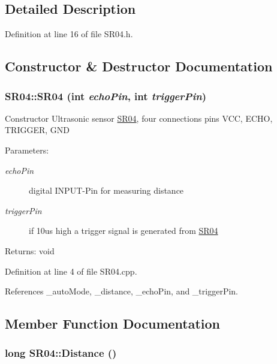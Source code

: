 \subsection{Detailed Description}


Definition at line 16 of file SR04.h.

\subsection{Constructor \& Destructor Documentation}
\hypertarget{class_s_r04_7af7a8b9d80f721c1d2802c1acbf6d10}{
\subsubsection[SR04]{\setlength{\rightskip}{0pt plus 5cm}SR04::SR04 (int {\em echoPin}, \/  int {\em triggerPin})}}
\label{class_s_r04_7af7a8b9d80f721c1d2802c1acbf6d10}


Constructor Ultrasonic sensor \hyperlink{class_s_r04}{SR04}, four connections pins VCC, ECHO, TRIGGER, GND \par
 \begin{Desc}
\item[Parameters:]
\begin{description}
\item[{\em echoPin}]digital INPUT-Pin for measuring distance \item[{\em triggerPin}]if 10us high a trigger signal is generated from \hyperlink{class_s_r04}{SR04}\end{description}
\end{Desc}
\begin{Desc}
\item[Returns:]void \end{Desc}


Definition at line 4 of file SR04.cpp.

References \_\-autoMode, \_\-distance, \_\-echoPin, and \_\-triggerPin.

\subsection{Member Function Documentation}
\hypertarget{class_s_r04_1fbb097bdcde18aa3095ddc96d41a653}{
\subsubsection[Distance]{\setlength{\rightskip}{0pt plus 5cm}long SR04::Distance ()}}
\label{class_s_r04_1fbb097bdcde18aa3095ddc96d41a653}


